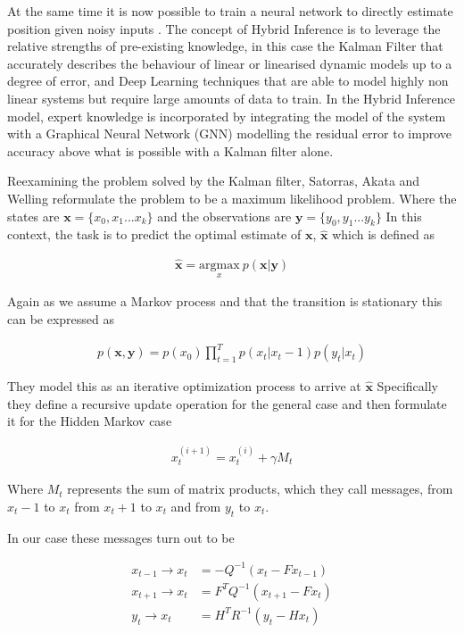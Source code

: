 \documentclass[]{../resources/final_report}
\begin{document}
At the same time it is now possible to train a neural network to directly estimate position given
noisy inputs \cite{NNStateEstimation}. The concept of Hybrid Inference is to leverage the relative 
strengths of pre-existing knowledge, in this case the Kalman Filter that accurately describes the 
behaviour of linear or linearised dynamic models up to a degree of error, and Deep Learning techniques 
that are able to model highly non linear systems but require large amounts of data to train.
In the Hybrid Inference model, expert knowledge is incorporated by integrating the model of the 
system with a Graphical Neural Network (GNN) modelling the residual error to improve accuracy above what is possible with a 
Kalman filter alone.

\pagebreak
Reexamining the problem solved by the Kalman filter, Satorras, Akata and Welling reformulate the 
problem to be a maximum likelihood problem\cite{Satorras2019CombiningGA}.
Where the states are $\mathbf{x} = \{x_0, x_1 ... x_k\}$ and the observations are $\mathbf{y} = \{y_0, y_1 ... y_k\}$
In this context, the task is to predict the optimal estimate of $\mathbf{x}$, $\mathbf{\hat{x}}$ which is defined as

\begin{align}
  \mathbf{\hat{x}} = \underset{x}{\text{argmax}}\ p(\mathbf{x}|\mathbf{y})
\end{align}

Again as we assume a Markov process and that the transition is stationary this can be expressed as 

\begin{align}
  p(\mathbf{x},\mathbf{y}) = p(x_0)\prod_{t=1}^T p(x_t|x_t-1) p(y_t|x_t)
\end{align}

They model this as an iterative optimization process to arrive at $\mathbf{\hat{x}}$
Specifically they define a recursive update operation for the general case and then formulate it 
for the Hidden Markov case

\begin{align}
  x_t^{(i+1)} = x_t^{(i)} + \gamma M_t
\end{align}

Where $M_t$ represents the sum of matrix products, which they call messages, from $x_t-1$ to $x_t$ 
from $x_t+1$ to $x_t$ and from $y_t$ to $x_t$.

In our case these messages turn out to be

\begin{align}
  x_{t-1} \rightarrow x_{t} &= -Q^{-1}(x_t - Fx_{t-1}) \\
  x_{t+1} \rightarrow x_{t} &= F^TQ^{-1}(x_{t+1} - Fx_t) \\
  y_t \rightarrow x_t &= H^TR^{-1}(y_t - Hx_t) 
\end{align}
\end{document}
